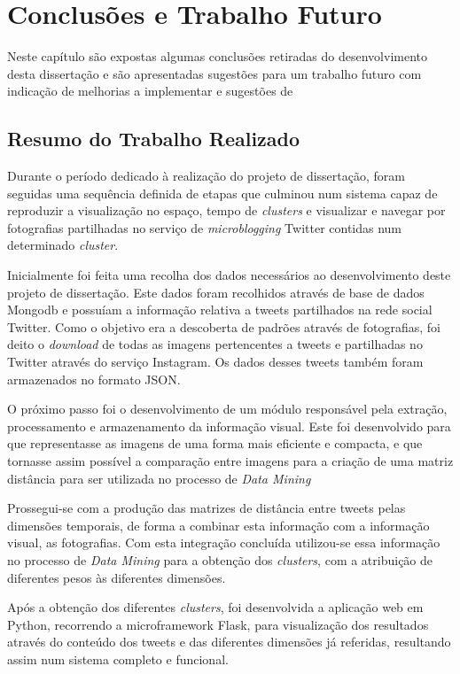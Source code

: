 \chapter{Conclusões e Trabalho Futuro} \label{chap:concl}

Neste capítulo são expostas algumas conclusões retiradas do desenvolvimento desta dissertação e são apresentadas sugestões para um trabalho futuro com indicação de melhorias a implementar e sugestões de 

\section{Resumo do Trabalho Realizado}

Durante o período dedicado à realização do projeto de dissertação, foram seguidas uma sequência definida de etapas que culminou num sistema capaz de reproduzir a visualização no espaço, tempo de \textit{clusters} e visualizar e navegar por fotografias partilhadas no serviço de \textit{microblogging} Twitter contidas num determinado \textit{cluster}.

Inicialmente foi feita uma recolha dos dados necessários ao desenvolvimento deste projeto de dissertação. Este dados foram recolhidos através de base de dados Mongodb e possuíam a informação relativa a tweets partilhados na rede social Twitter. Como o objetivo era a descoberta de padrões através de fotografias, foi deito o \textit{download} de todas  as imagens pertencentes a tweets e partilhadas no Twitter através do serviço Instagram. Os dados desses tweets também foram armazenados no formato JSON.

O próximo passo foi o desenvolvimento de um módulo responsável pela extração, processamento e armazenamento da informação visual. Este foi desenvolvido para que representasse as imagens de uma forma mais eficiente e compacta, e que tornasse assim possível a comparação entre imagens para a criação de uma matriz distância para ser utilizada no processo de \textit{Data Mining}

Prossegui-se com a produção das matrizes de distância entre tweets pelas dimensões temporais, de forma a combinar esta informação com a informação visual, as fotografias. Com esta integração concluída utilizou-se essa informação no processo de \textit{Data Mining} para a obtenção dos \textit{clusters}, com a atribuição de diferentes pesos às diferentes dimensões. 

Após a obtenção dos diferentes \textit{clusters}, foi desenvolvida a aplicação web em Python, recorrendo a microframework Flask, para visualização dos resultados através do conteúdo dos tweets e das diferentes dimensões já referidas, resultando assim num sistema completo e funcional.


